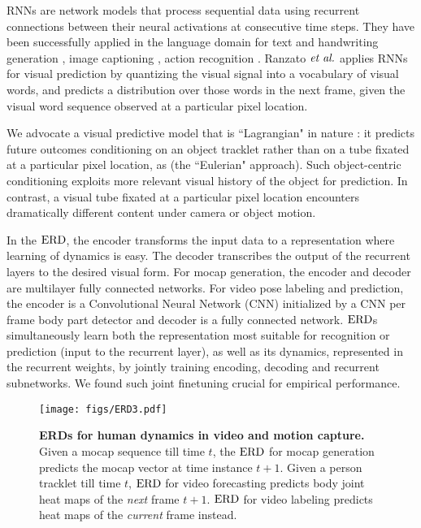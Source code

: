 \documentclass[10pt,twocolumn,letterpaper]{article}
\begin{document}
RNNs  are network models that process sequential data using recurrent connections between their neural activations at consecutive time steps.  
They have been successfully applied in the language domain for text and handwriting generation  \cite{DBLP:conf/interspeech/KombrinkMKB11,ICML2011Sutskever_524,DBLP:journals/corr/Graves13}, image captioning \cite{DBLP:journals/corr/VinyalsTBE14}, action recognition \cite{DBLP:journals/corr/DonahueHGRVSD14}.  
Ranzato $\text{\textit{et al.}}$ \cite{DBLP:journals/corr/RanzatoSBMCC14}  applies  RNNs for visual prediction by  quantizing the visual signal into a vocabulary of visual words, and predicts a distribution over those words in the next frame, given the visual word sequence observed at a particular  pixel location. 


We advocate a visual predictive model that is ``Lagrangian" in nature \cite{wiki}:  it predicts future outcomes conditioning on an object tracklet rather than on a tube fixated at a particular pixel location, as \cite{DBLP:journals/corr/RanzatoSBMCC14} (the ``Eulerian" approach).  Such object-centric conditioning exploits more relevant visual history of the object for prediction. In contrast, a visual tube fixated at a particular pixel location   encounters dramatically different content under camera or object motion.








In the $\text{ERD}$, 
the encoder  transforms the input  data to a representation where    learning of  dynamics is easy. The decoder transcribes the output of the recurrent layers to the desired visual form.  For mocap generation, the encoder and decoder are multilayer fully connected networks. For video pose labeling and prediction, the encoder is a Convolutional Neural Network (CNN) \cite{Cun90handwrittendigit} initialized by a CNN per frame body part detector and decoder is a fully connected network.  $\text{ERD}$s   simultaneously learn both the representation most suitable for recognition or prediction (input to the recurrent layer), as well as its dynamics, represented in the recurrent weights, by jointly training encoding, decoding and recurrent subnetworks. 
We found such joint finetuning crucial for empirical performance.  




\begin{figure*}[ht!]
\begin{center}
\texttt{[image: figs/ERD3.pdf]}
\end{center}
\caption{
\textbf{ERDs for human dynamics in video and motion capture.}  Given a mocap sequence till time $t$, the $\text{ERD}$  for mocap generation predicts the mocap vector at  time instance $t+1$.  
Given a person tracklet till time $t$, $\text{ERD}$  for video  forecasting  predicts body joint heat maps  of the \textit{next} frame $t+1$.  $\text{ERD}$ for video  labeling predicts heat maps of the \textit{current} frame instead.  
}
\label{fig:autornn}
\end{figure*}
\end{document}
